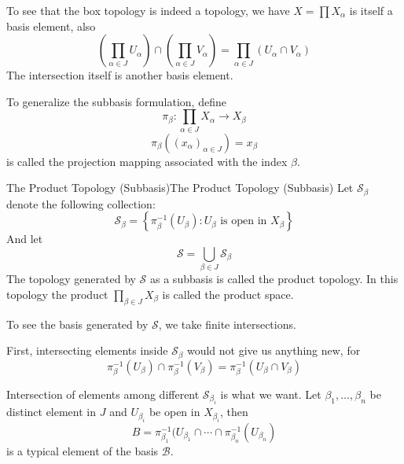 \documentclass[../main.tex]{subfiles}
\begin{document}
To see that the box topology is indeed a topology, we have $X = \prod X_{\alpha}$ is itself a basis element, also
\begin{equation*}
\left(\prod_{\alpha\in J}U_{\alpha}\right)\cap \left(\prod_{\alpha\in J}V_{\alpha}\right) = \prod _{\alpha\in J} \left(U_{\alpha}\cap V_{\alpha}\right)
\end{equation*}
The intersection itself is another basis element.

To generalize the subbasis formulation, define
\begin{equation}
\pi_{\beta}: \prod_{\alpha\in J}X_{\alpha} \rightarrow X_{\beta}
\end{equation}
\begin{equation*}
\pi_{\beta}((x_{\alpha})_{\alpha\in J}) = x_{\beta}
\end{equation*}
is called the projection mapping associated with the index $\beta$.

\begin{definition}{The Product Topology (Subbasis)}{The Product Topology (Subbasis)}
Let $\mathcal{S}_{\beta}$ denote the following collection:
\begin{equation*}
\mathcal{S}_{\beta} = \left\{ \pi_{\beta}^{-1}(U_{\beta}) : U_{\beta} \text{ is open in }X_{\beta} \right\}
\end{equation*}
And let
\begin{equation*}
\mathcal{S} = \bigcup_{\beta\in J} \mathcal{S}_{\beta}
\end{equation*}
The topology generated by $\mathcal{S}$ as a subbasis is called the product topology. In this topology the product $\prod_{\beta\in J}X_{\beta}$ is called the product space.
\end{definition}

To see the basis generated by $\mathcal{S}$, we take finite intersections.

First, intersecting elements inside $\mathcal{S}_{\beta}$ would not give us anything new, for
\begin{equation*}
\pi_{\beta}^{-1}(U_{\beta})\cap \pi_{\beta}^{-1}(V_{\beta}) = \pi_{\beta}^{-1}(U_{\beta}\cap V_{\beta})
\end{equation*}

Intersection of elements among different $\mathcal{S}_{\beta_i}$ is what we want. Let $\beta_1, \ldots ,\beta_n$ be distinct element in $J$ and $U_{\beta_i}$ be open in $X_{\beta_i}$, then
\begin{equation*}
B = \pi_{\beta_1}^{-1}(U_{\beta_1} \cap \cdots \cap \pi_{\beta_n}^{-1}(U_{\beta_n})
\end{equation*}
is a typical element of the basis $\mathcal{B}$.
\end{document}
